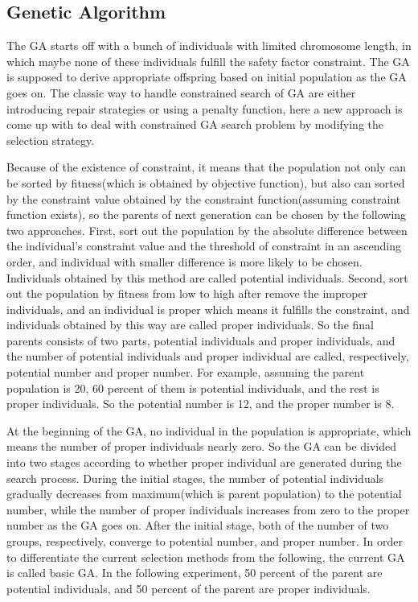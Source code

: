\documentclass[USenglish]{article}
\begin{document}
\subsection{Genetic Algorithm}
The GA starts off with a bunch of individuals with limited chromosome length, in which maybe none of
these individuals fulfill the safety factor constraint. The GA is supposed to derive appropriate
offspring based on initial population as the GA goes on. The classic way to handle constrained
search of GA are either introducing repair strategies or using a penalty function, here a new
approach is come up with to deal with constrained GA search problem by modifying the selection
strategy.

  Because of the existence of constraint, it means that the population not only can be sorted by
fitness(which is obtained by objective function), but also can sorted by the constraint value
obtained by the constraint function(assuming constraint function exists), so the parents of next
generation can be chosen by the following two approaches. First, sort out the population by the
absolute difference between the individual's constraint value and the threshold of constraint in an
ascending order, and individual with smaller difference is more likely to be chosen. Individuals
obtained by this method are called potential individuals. Second, sort out the population by fitness
from low to high after remove the improper individuals, and an individual is proper which means it
fulfills the constraint, and individuals obtained by this way are called proper individuals. So the
final parents consists of two parts, potential individuals and proper individuals, and the number of
potential individuals and proper individual are called, respectively, potential number and proper
number. For example, assuming the parent population is 20, 60 percent of them is potential
individuals, and the rest is proper individuals. So the potential number is 12, and the proper
number is 8.

  At the beginning of the GA, no individual in the population is appropriate, which means the number
of proper individuals nearly zero. So the GA can be divided into two stages according to whether
proper individual are generated during the search process. During the initial stages, the number of
potential individuals gradually decreases from maximum(which is parent population) to the potential
number, while the number of proper individuals increases from zero to the proper number as the GA
goes on. After the initial stage, both of the number of two groups, respectively, converge to
potential number, and proper number. In order to differentiate the current selection methods from
the following, the current GA is called basic GA. In the following experiment, 50 percent of the
parent are potential individuals, and 50 percent of the parent are proper individuals.
\end{document}
